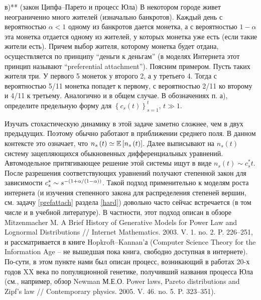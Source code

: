 \begin{problem}
в)** (закон Ципфа--Парето и процесс Юла) 
В некотором городе живет 
неограниченно много жителей (изначально банкротов). Каждый день с 
вероятностью $\alpha <1$ одному из банкротов дается монетка, а с 
вероятностью $1-\alpha $ эта монетка отдается одному из жителей, у которых 
монетка уже есть (если такие жители есть). Причем выбор жителя, которому 
монетка будет отдана, осуществляется по принципу ``деньги к деньгам'' (в 
моделях Интернета этот принцип называют ``preferential attachment''). 
Поясним примером. Пусть таких жителя три. У первого 5 монеток у второго 2, а 
у третьего 4. Тогда с вероятностью 5/11 монетка попадет к первому, с 
вероятностью 2/11 ко второму и 4/11 к третьему. Аналогично и в общем случае. 
В обозначениях п. а), определите предельную форму для $\left\{ {c_s \left( t 
\right)} \right\}_{s=1}^t $, $t\gg 1$.

\begin{ordre} 
 Изучать стохастическую динамику в этой задаче заметно 
сложнее, чем в двух предыдущих. Поэтому обычно работают в приближении 
среднего поля. В данном контексте это означает, что $n_s \left( t 
\right)\simeq \mathrm{{\mathbb E}}\left[ {n_s \left( t \right)} \right]$. Далее выписывают на 
$n_s \left( t \right)$ систему зацепляющихся обыкновенных дифференциальных 
уравнений. Автомодельное притягивающее решение этой системы ищут в виде $n_s 
\left( t \right)\sim c_s^\ast t$. После разрешения соответствующих уравнений 
получают степенной закон для зависимости $c_s^\ast \sim s^{-\left( {1+\alpha 
\mathord{\left/ {\vphantom {\alpha {\left( {1-\alpha} \right)}}} \right. 
\kern-\nulldelimiterspace} {\left( {1- \alpha} \right)}} \right)}$. Такой подход 
применительно к моделям роста интернета (и изучения степенного закона для 
распределения степеней вершин, см. задачу \ref{prefattach} раздела \ref{hard}) 
довольно часто сейчас встречается (в том числе и в учебной литературе). В 
частности, этот подход описан в обзоре Mitzenmacher M. A Brief History of Generative Models 
for Power Law and Lognormal Distributions // Internet Mathematics. 2003. V. 
1. no. 2. P. 226--251, и рассматривается в книге Hopkroft--Kannan'а 
(Computer Science Theory for the Information Age -- не вышедшая пока книга, 
свободно доступная в интернете). По-сути, в этом пункте нами был описан 
процесс, возникающий в работах 20-х годов XX века по популяционной генетике, 
получивший названия процесса Юла (см., например, обзор Newman М.Е.О. Power laws, Pareto 
distributions and Zipf's law // Contemporary physics. 2005. V. 46. no. 5. P. 
323--351).
\end{ordre}


\end{problem}
